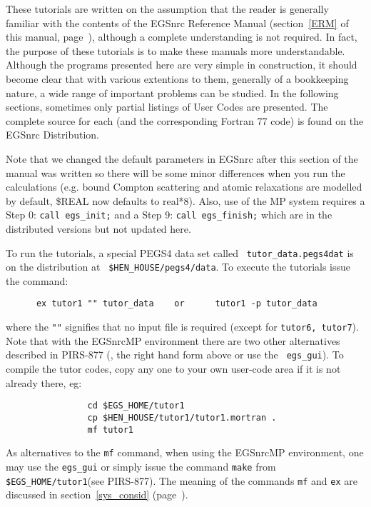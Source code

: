 These tutorials are written on the assumption that the reader is
generally familiar with the contents of the EGSnrc Reference Manual
(section~\ref{ERM} of this manual, page~\pageref{ERM}), although a
complete understanding is not required.  In fact, the purpose
of these tutorials is to make these manuals more understandable.
Although the programs presented here are very simple in construction,
it should become clear that with various extentions to them, generally
of a bookkeeping nature, a wide range of important problems can be
studied.  In the following sections, sometimes only partial listings of
User Codes are presented.  The complete source for each (and the
corresponding Fortran 77 code) is found on the EGSnrc Distribution.

Note that we changed the default parameters in EGSnrc after this section of
the manual was written so there will be some minor differences when you run
the calculations (e.g. bound Compton scattering and atomic relaxations are
modelled by default, \$REAL now defaults to real*8).  Also, use of the MP
system requires a Step 0: {\tt call egs\_init;} and a Step 9: {\tt call
egs\_finish;} which are in the distributed versions but not updated here.


To run the tutorials, a special PEGS4 data set called {\tt
tutor\_data.pegs4dat} is on the distribution at {\tt
\$HEN\_HOUSE/pegs4/data}.  To execute the tutorials issue the
command:
\begin{verbatim}
      ex tutor1 "" tutor_data    or      tutor1 -p tutor_data
\end{verbatim}
where the {\tt ""} signifies that no input file is required (except for
{\tt tutor6, tutor7}). Note that with the EGSnrcMP environment
there are two other alternatives described
in PIRS-877\cite{Ka03} (\viz, the right hand form above or use the {\tt
egs\_gui}).  To compile the tutor codes, copy any one to your
own user-code area if it is not already there, eg:
\vspace*{-3mm}
\begin{verbatim}
                cd $EGS_HOME/tutor1
                cp $HEN_HOUSE/tutor1/tutor1.mortran .
                mf tutor1
\end{verbatim}
\vspace*{-3mm}
As alternatives to the {\tt mf} command, when using the EGSnrcMP
environment, one may use the {\tt egs\_gui} or simply issue the command
{\tt make} from {\tt \$EGS\_HOME/tutor1}(see PIRS-877\cite{Ka03}).
The meaning of the commands {\tt mf} and {\tt ex} are discussed in
section~\ref{sys_consid} (page~\pageref{sys_consid}).

